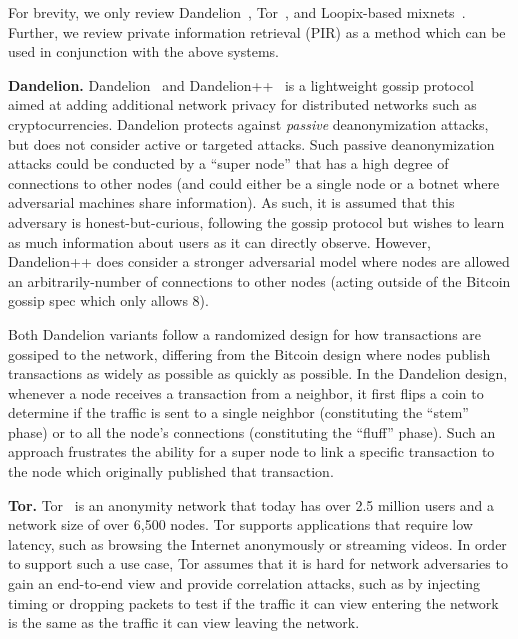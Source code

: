 \documentclass{article}
\begin{document}
For brevity, we only review
Dandelion~\cite{Fanti:2018:DLC,BojjaVenkatakrishnan:2017:DRB},
Tor~\cite{tor-specification}, and
Loopix-based mixnets~\cite{Piotrowska:2017:LAS}.
Further, we review private information retrieval (PIR) as a method which can be
used in conjunction with the above systems.

\textbf{Dandelion.}
Dandelion~\cite{BojjaVenkatakrishnan:2017:DRB} and
Dandelion++~\cite{Fanti:2018:DLC} is a lightweight gossip protocol aimed at
adding additional network privacy for
distributed networks such as cryptocurrencies. Dandelion protects against
\emph{passive}
deanonymization attacks, but does not consider active or targeted attacks. Such
passive deanonymization attacks could be conducted by a ``super node'' that has
a high degree of connections to other nodes (and could either be a single node
or a botnet where adversarial machines share information). As such, it is
assumed that this adversary is honest-but-curious, following the gossip protocol
but wishes to learn as much information about users as it can directly observe.
However, Dandelion++ does consider a stronger adversarial model where nodes are
allowed an arbitrarily-number of connections to other nodes (acting outside of the
Bitcoin gossip spec which only allows 8).

Both Dandelion variants follow a randomized design for how transactions are
gossiped to the network, differing from the Bitcoin design where nodes publish
transactions as widely as possible as quickly as possible. In the Dandelion
design, whenever a node receives a transaction from a neighbor, it
first flips a coin to determine if the traffic is sent to a single
neighbor (constituting the ``stem'' phase) or to all the node's connections
(constituting the ``fluff'' phase). Such an approach frustrates the ability for
a super node to link a specific transaction to the node which originally
published that transaction.


\textbf{Tor.}
Tor~\cite{tor-specification} is an anonymity network that today has over 2.5
million users and a network
size of over 6,500 nodes. Tor supports applications that require low latency,
such as browsing the Internet anonymously or streaming videos. In order to
support such a use case, Tor assumes that it is hard for network adversaries to
gain an end-to-end view and provide correlation attacks, such as by injecting
timing or dropping packets to test if the traffic it can view entering the
network is the same as the traffic it can view leaving the network.
\end{document}
